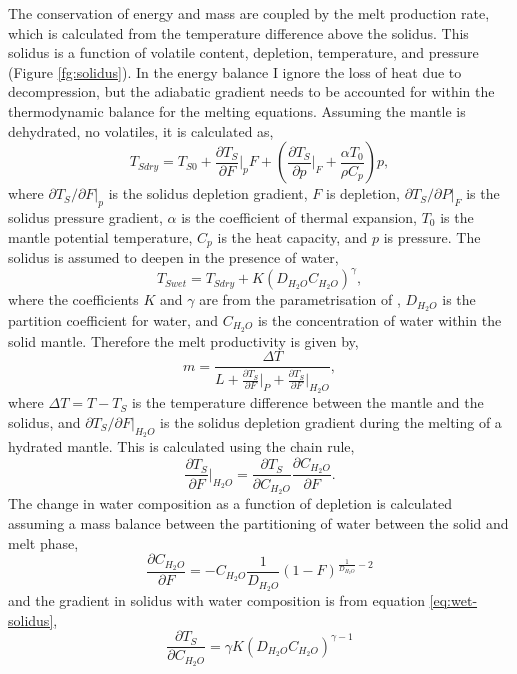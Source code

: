 \begin{subappendices}
The conservation of energy and mass are coupled by the melt production rate, which is calculated from the temperature difference above the solidus. This solidus is a function of volatile content, depletion, temperature, and pressure (Figure \ref{fg:solidus}). In the energy balance I ignore the loss of heat due to decompression, but the adiabatic gradient needs to be accounted for within the thermodynamic balance for the melting equations. Assuming the mantle is dehydrated, no volatiles, it is calculated as,
\begin{equation}
T_{Sdry} = T_{S0} + \frac{\partial T_{S}}{\partial F}\vert_{p}F + \left(\frac{\partial T_{S}}{\partial p}\vert_{F} + \frac{\alpha T_{0}}{\rho C_{p}}\right)p,
\label{eq:dry-solidus}
\end{equation}
where $\partial T_{S}/\partial F\vert_{p}$ is the solidus depletion gradient, $F$ is depletion, $\partial T_{S}/\partial P\vert_{F}$ is the solidus pressure gradient, $\alpha$ is the coefficient of thermal expansion, $T_{0}$ is the mantle potential temperature, $C_{p}$ is the heat capacity, and $p$ is pressure. The solidus is assumed to deepen in the presence of water,
\begin{equation}
T_{Swet} = T_{Sdry} + K\left(D_{H_{2}O}C_{H_{2}O}\right)^{\gamma},
\label{eq:wet-solidus}
\end{equation}
where the coefficients $K$ and $\gamma$ are from the parametrisation of \cite{katz-etal-2003}, $D_{H_{2}O}$ is the partition coefficient for water, and $C_{H_{2}O}$ is the concentration of water within the solid mantle. Therefore the melt productivity is given by,
\begin{equation}
m = \frac{\Delta T}{L + \frac{\partial T_{S}}{\partial F}\vert_{P} + \frac{\partial T_{S}}{\partial F}\vert_{H_{2}O}},
\label{eq:melt-productivity}
\end{equation}
where $\Delta T = T-T_{S}$ is the temperature difference between the mantle and the solidus, and $\partial T_{S}/\partial F\vert_{H_{2}O}$ is the solidus depletion gradient during the melting of a hydrated mantle. This is calculated using the chain rule,
\begin{equation}
\frac{\partial T_{S}}{\partial F}\vert_{H_{2}O} = \frac{\partial T_{S}}{\partial C_{H_{2}O}} \frac{\partial C_{H_{2}O}}{\partial F}.
\end{equation}
The change in water composition as a function of depletion is calculated  assuming a mass balance between the partitioning of water between the solid and melt phase,
\begin{equation}
\frac{\partial C_{H_{2}O}}{\partial F} = -C_{H_{2}O} \frac{1}{D_{H_{2}O}}\left(1-F\right)^{\frac{1}{D_{H_{2}O}}-2}
\end{equation}
and the gradient in solidus with water composition is from equation \ref{eq:wet-solidus},
\begin{equation}
\frac{\partial T_{S}}{\partial C_{H_{2}O}} = \gamma K\left(D_{H_{2}O}C_{H_{2}O}\right)^{\gamma-1}
\end{equation}


\end{subappendices}
